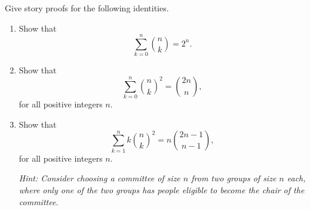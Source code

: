 \documentclass[11pt]{article}
\begin{document}
Give story proofs for the following identities.

\begin{enumerate}[label=(\alph*), leftmargin=*]
    \item Show that
    \[
    \sum_{k=0}^{n} {n \choose k}=2^n.
    \]

    \item Show that
    \[
    \sum_{k=0}^{n}{n \choose k}^2={2n \choose n},
    \]
    for all positive integers $n$.

    \item Show that
    \[
    \sum_{k=1}^{n} k{n \choose k}^2
    =
    n{2n-1 \choose n-1},
    \]
    for all positive integers $n$.

    \emph{Hint: Consider choosing a committee of size $n$ from two groups of size $n$ each, where only one of the two groups has people eligible to become the chair of the committee.}
\end{enumerate}
\end{document}
